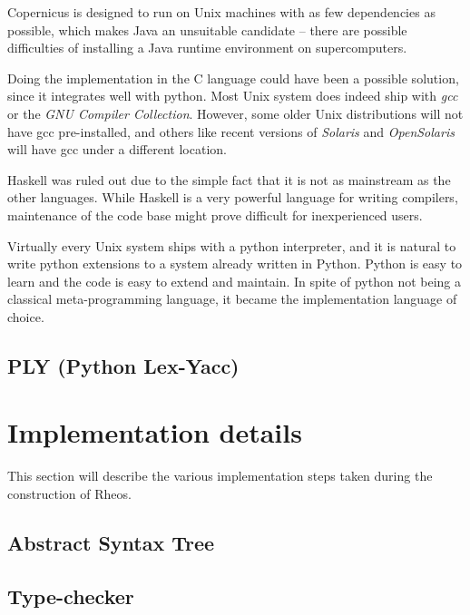 Copernicus is designed to run on Unix machines with as few
dependencies as possible, which makes Java an unsuitable candidate --
there are possible difficulties of installing a Java runtime
environment on supercomputers.

Doing the implementation in the C language could have been a possible
solution, since it integrates well with python. Most Unix system does
indeed ship with \emph{gcc} or the \emph{GNU Compiler
  Collection}. However, some older Unix distributions will not have
gcc pre-installed, and others like recent versions of \emph{Solaris}
and \emph{OpenSolaris} will have gcc under a different location.

Haskell was ruled out due to the simple fact that it is not as
mainstream as the other languages. While Haskell is a very powerful
language for writing compilers, maintenance of the code base might
prove difficult for inexperienced users.

Virtually every Unix system ships with a python interpreter, and it is
natural to write python extensions to a system already written in
Python. Python is easy to learn and the code is easy to extend and
maintain. In spite of python not being a classical meta-programming
language, it became the implementation language of choice.


\subsection{PLY (Python Lex-Yacc)}\label{sec:ply}



\section{Implementation details}
This section will describe the various implementation steps taken
during the construction of Rheos.

\subsection{Abstract Syntax Tree}\label{sec:ast}



\subsection{Type-checker}\label{sec:typechecker}




